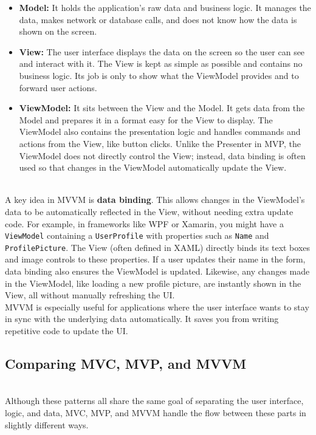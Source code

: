 \begin{itemize}
\item
\protect{}\label{lK4FR59UWDg0QNhdfFBzS}
\textbf{Model:} It holds the application's raw data and business logic. It manages the data, makes network or database calls, and does not know how the data is shown on the screen.
\item
\protect{}\label{SkLlnAdo2G4D2QjKNGFW2}
\textbf{View:} The user interface displays the data on the screen so the user can see and interact with it. The View is kept as simple as possible and contains no business logic. Its job is only to show what the ViewModel provides and to forward user actions.
\item
\protect{}\label{z4JgAwjS_iWkclYQTuAVO}
\textbf{ViewModel:} It sits between the View and the Model. It gets data from the Model and prepares it in a format easy for the View to display. The ViewModel also contains the presentation logic and handles commands and actions from the View, like button clicks. Unlike the Presenter in MVP, the ViewModel does not directly control the View; instead, data binding is often used so that changes in the ViewModel automatically update the View.
\end{itemize}
\\
A key idea in MVVM is \textbf{data binding}. This allows changes in the ViewModel's data to be automatically reflected in the View, without needing extra update code. For example, in frameworks like WPF or Xamarin, you might have a \texttt{ViewModel} containing a \texttt{UserProfile} with properties such as \texttt{Name} and \texttt{ProfilePicture}. The View (often defined in XAML) directly binds its text boxes and image controls to these properties. If a user updates their name in the form, data binding also ensures the ViewModel is updated. Likewise, any changes made in the ViewModel, like loading a new profile picture, are instantly shown in the View, all without manually refreshing the UI.
\\
MVVM is especially useful for applications where the user interface wants to stay in sync with the underlying data automatically. It saves you from writing repetitive code to update the UI.

\subsection{Comparing MVC, MVP, and MVVM}\label{cvrDEw4JrqMK3Ta8ubJnE}
\\
Although these patterns all share the same goal of separating the user interface, logic, and data, MVC, MVP, and MVVM handle the flow between these parts in slightly different ways.

